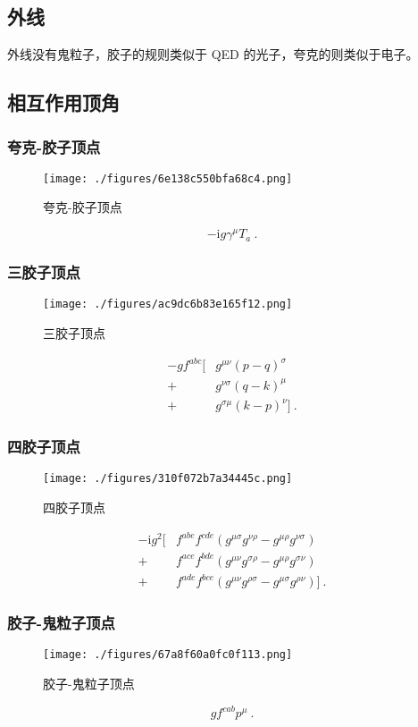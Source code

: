 \subsection{外线}
外线没有鬼粒子，胶子的规则类似于 QED 的光子，夸克的则类似于电子。

\subsection{相互作用顶角}
\subsubsection{夸克-胶子顶点}
\begin{figure}[ht]
\centering
\texttt{[image: ./figures/6e138c550bfa68c4.png]}
\caption{夸克-胶子顶点} \label{fig_qcdfey_4}
\end{figure}
\begin{equation}
-\mathrm i g \gamma^\mu T_a ~.
\end{equation}

\subsubsection{三胶子顶点}
\begin{figure}[ht]
\centering
\texttt{[image: ./figures/ac9dc6b83e165f12.png]}
\caption{三胶子顶点} \label{fig_qcdfey_5}
\end{figure}
\begin{equation}
    \begin{aligned}
		-g f^{abc}  [&g^{\mu\nu}(p-q)^\sigma \\
		+& g^{\nu\sigma} (q-k)^\mu \\
		+& g^{\sigma\mu}(k-p)^\nu] ~.
	\end{aligned}
\end{equation}

\subsubsection{四胶子顶点}
\begin{figure}[ht]
\centering
\texttt{[image: ./figures/310f072b7a34445c.png]}
\caption{四胶子顶点} \label{fig_qcdfey_6}
\end{figure}
\begin{equation}
	\begin{aligned}
		-\mathrm i g^2 [& f^{abe} f^{cde}(g^{\mu\sigma}g^{\nu\rho} - g^{\mu\rho}g^{\nu\sigma}) \\
		+& f^{ace}f^{bde}(g^{\mu\nu} g^{\sigma\rho} - g^{\mu\rho}g^{\sigma\nu}) \\
		+& f^{ade}f^{bce} (g^{\mu\nu} g^{\rho\sigma} - g^{\mu\sigma}g^{\rho\nu})] ~.
	\end{aligned}
\end{equation}

\subsubsection{胶子-鬼粒子顶点}
\begin{figure}[ht]
\centering
\texttt{[image: ./figures/67a8f60a0fc0f113.png]}
\caption{胶子-鬼粒子顶点} \label{fig_qcdfey_7}
\end{figure}
\begin{equation}
g f^{cab} p^\mu ~.
\end{equation}
